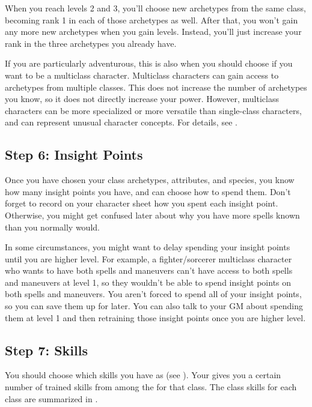         When you reach levels 2 and 3, you'll choose new archetypes from the same class, becoming rank 1 in each of those archetypes as well.
        After that, you won't gain any more new archetypes when you gain levels.
        Instead, you'll just increase your rank in the three archetypes you already have.

        If you are particularly adventurous, this is also when you should choose if you want to be a multiclass character.
        Multiclass characters can gain access to archetypes from multiple classes.
        This does not increase the number of archetypes you know, so it does not directly increase your power.
        However, multiclass characters can be more specialized or more versatile than single-class characters, and can represent unusual character concepts.
        For details, see .

    \subsection{Step 6: Insight Points}
        Once you have chosen your class archetypes, attributes, and species, you know how many insight points you have, and can choose how to spend them.
        Don't forget to record on your character sheet how you spent each insight point.
        Otherwise, you might get confused later about why you have more spells known than you normally would.

        In some circumstances, you might want to delay spending your insight points until you are higher level.
        For example, a fighter/sorcerer multiclass character who wants to have both spells and maneuvers can't have access to both spells and maneuvers at level 1, so they wouldn't be able to spend insight points on both spells and maneuvers.
        You aren't forced to spend all of your insight points, so you can save them up for later.
        You can also talk to your GM about spending them at level 1 and then retraining those insight points once you are higher level.

    \subsection{Step 7: Skills}
        You should choose which skills you have as  (see ).
        Your  gives you a certain number of trained skills from among the  for that class.
        The class skills for each class are summarized in .

